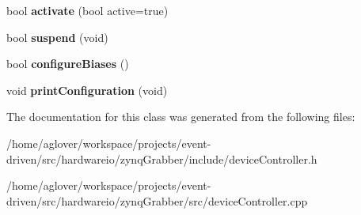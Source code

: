 \begin{DoxyCompactItemize}
\item 
bool {\bfseries activate} (bool active=true)\hypertarget{classvDevCtrl_a737b66cec44fc2bd0ebb29dccf15838b}{}\label{classvDevCtrl_a737b66cec44fc2bd0ebb29dccf15838b}

\item 
bool {\bfseries suspend} (void)\hypertarget{classvDevCtrl_a9cc8b11acf775f7c7afaf736ffe69c52}{}\label{classvDevCtrl_a9cc8b11acf775f7c7afaf736ffe69c52}

\item 
bool {\bfseries configure\+Biases} ()\hypertarget{classvDevCtrl_a33fb7c392cfdaad5c35b7683eacc61e2}{}\label{classvDevCtrl_a33fb7c392cfdaad5c35b7683eacc61e2}

\item 
void {\bfseries print\+Configuration} (void)\hypertarget{classvDevCtrl_a4fc72bb26da523c7c731b9465e19a5cd}{}\label{classvDevCtrl_a4fc72bb26da523c7c731b9465e19a5cd}

\end{DoxyCompactItemize}


The documentation for this class was generated from the following files\+:\begin{DoxyCompactItemize}
\item 
/home/aglover/workspace/projects/event-\/driven/src/hardwareio/zynq\+Grabber/include/device\+Controller.\+h\item 
/home/aglover/workspace/projects/event-\/driven/src/hardwareio/zynq\+Grabber/src/device\+Controller.\+cpp\end{DoxyCompactItemize}
